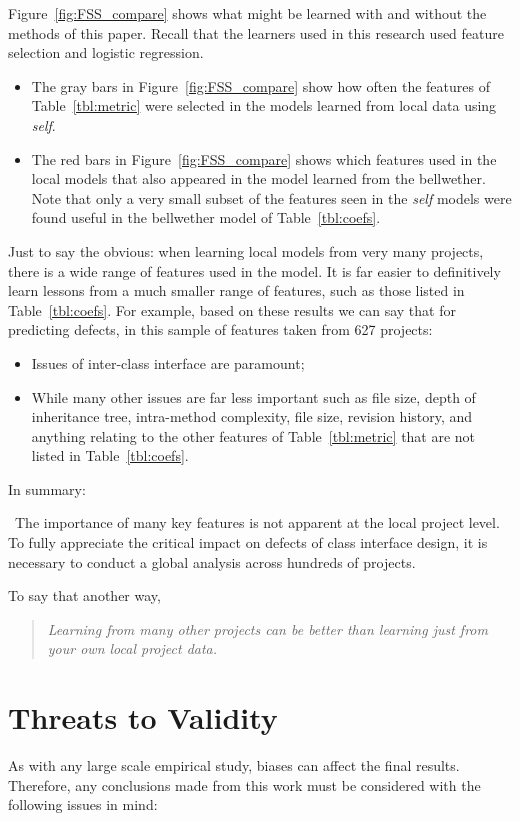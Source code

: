 \documentclass[10pt,journal,compsoc]{IEEEtran}
\newcommand{\fig}[1]{Figure~\ref{fig:#1}}
\newcommand{\bi}{\begin{itemize}}
\newcommand{\ei}{\end{itemize}}
\newenvironment{RQ}[1]%
{\noindent\begin{minipage}[c]{\linewidth}%
\begin{bclogo}[couleur=gray!20,%
                arrondi=0.1,logo=\bctrombone,%
                ombre=true%
                ]{{\small  ~#1}}}%
{\end{bclogo}\vspace{2mm}\end{minipage}}
\begin{document}
\fig{FSS_compare} shows what might be learned with and without
the methods of this paper. Recall that the learners used in this research used feature selection and  logistic regression.
\begin{itemize}
\item  The gray bars in \fig{FSS_compare} show how often the features
of Table~\ref{tbl:metric} were selected in the models learned from
local data using {\em self}. 
\item
The red bars in \fig{FSS_compare} shows which features
used in the local models that also appeared in the model learned from the bellwether. 
  Note that only a very
small subset of the features seen in the  {\em self} models
were found useful in the bellwether model of Table~\ref{tbl:coefs}.
\end{itemize}
Just to say the obvious:
when learning
local models from very many projects, there is a wide range 
of features used in the model.
It is far easier to 
definitively learn lessons from a much smaller range
of features, such as those listed in Table~\ref{tbl:coefs}.
For example,
based on these results
we can say that for predicting defects, in this sample of  features taken from 627 projects:
\bi
\item Issues of inter-class interface are paramount;
\item While many other  issues are far less important such as file size, depth of inheritance tree, intra-method complexity, file size, revision history, and anything relating to  the other features of Table~\ref{tbl:metric}
that are not listed in Table~\ref{tbl:coefs}.
\ei
In summary:

\begin{RQ}
{The importance of many key features is not apparent at the local
project level. To fully appreciate the critical impact on defects
of class interface design,  it is necessary to conduct
a global analysis across hundreds of projects. }
\end{RQ}
To say that another way, 
\begin{quote}
{\em 
Learning from many other projects can be better than learning just from your own local project data.
}\end{quote}


\section{Threats to Validity}
\label{sec:validity}

As with any large scale empirical study, biases can affect the final
results. Therefore, any conclusions made from this work
must be considered with the following issues in mind:
\end{document}
